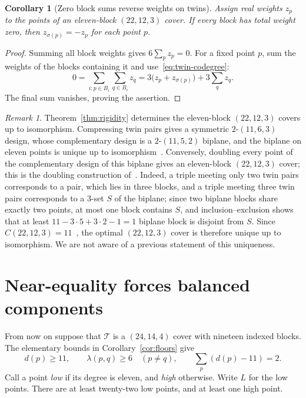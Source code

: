 \documentclass[11pt,letterpaper]{article}
\newtheorem{corollary}[theorem]{Corollary}
\theoremstyle{definition}\newtheorem{definition}[theorem]{Definition}
\theoremstyle{remark}\newtheorem{remark}[theorem]{Remark}
\newcommand{\calT}{\mathcal T}
\newcommand{\lam}{\lambda}
\begin{document}
\begin{corollary}[Zero block sums reverse weights on twins]\label{cor:twinbalance}
Assign real weights $z_p$ to the points of an eleven-block $(22,12,3)$ cover. If every block has total weight zero, then $z_{\sigma(p)}=-z_p$ for each point $p$.
\end{corollary}
\begin{proof}
Summing all block weights gives $6\sum_pz_p=0$. For a fixed point $p$, sum the weights of the blocks containing it and use~\eqref{eq:twin-codegree}:
\[
 0=\sum_{i:p\in B_i}\sum_{q\in B_i}z_q
 =3\bigl(z_p+z_{\sigma(p)}\bigr)+3\sum_qz_q.
\]
The final sum vanishes, proving the assertion.
\end{proof}

\begin{remark}\label{rem:unique}
Theorem~\ref{thm:rigidity} determines the eleven-block $(22,12,3)$ covers up to isomorphism. Compressing twin pairs gives a symmetric $2$-$(11,6,3)$ design, whose complementary design is a $2$-$(11,5,2)$ biplane, and the biplane on eleven points is unique up to isomorphism~\cite{Hussain,Cameron}. Conversely, doubling every point of the complementary design of this biplane gives an eleven-block $(22,12,3)$ cover; this is the doubling construction of~\cite{GKP}. Indeed, a triple meeting only two twin pairs corresponds to a pair, which lies in three blocks, and a triple meeting three twin pairs corresponds to a $3$-set $S$ of the biplane; since two biplane blocks share exactly two points, at most one block contains $S$, and inclusion--exclusion shows that at least $11-3\cdot5+3\cdot2-1=1$ biplane block is disjoint from $S$. Since $C(22,12,3)=11$~\cite{LJCR}, the optimal $(22,12,3)$ cover is therefore unique up to isomorphism. We are not aware of a previous statement of this uniqueness.
\end{remark}

\section{Near-equality forces balanced components}\label{sec:components}
From now on suppose that $\calT$ is a $(24,14,4)$ cover with nineteen indexed blocks. The elementary bounds in Corollary~\ref{cor:floors} give
\[
 d(p)\ge11,\qquad \lam(p,q)\ge6\quad(p\ne q),
 \qquad \sum_p(d(p)-11)=2.
\]
Call a point \emph{low} if its degree is eleven, and \emph{high} otherwise. Write $L$ for the low points. There are at least twenty-two low points, and at least one high point.
\end{document}

